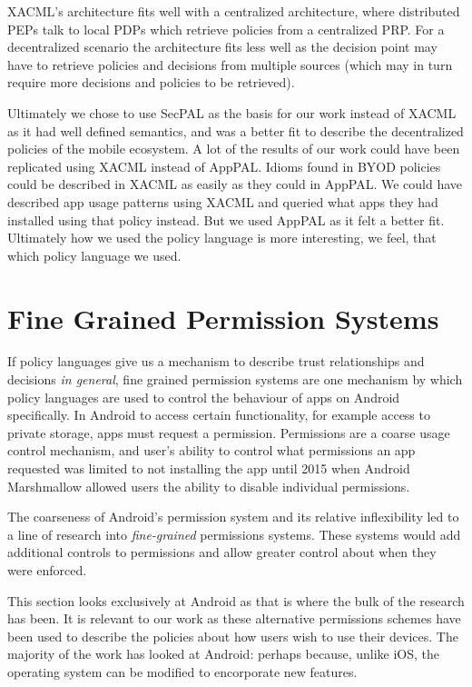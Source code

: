 \documentclass[thesis.tex]{subfiles}
\begin{document}
XACML's architecture fits well with a centralized architecture, where
distributed PEPs talk to local PDPs which retrieve policies from a centralized
PRP. For a decentralized scenario the architecture fits less well as the
decision point may have to retrieve policies and decisions from multiple sources
(which may in turn require more decisions and policies to be retrieved).

Ultimately we chose to use SecPAL as the basis for our work instead of XACML as
it had well defined semantics, and was a better fit to describe the
decentralized policies of the mobile ecosystem. A lot of the results of our work
could have been replicated using XACML instead of AppPAL. Idioms found in BYOD
policies could be described in XACML as easily as they could in AppPAL. We could
have described app usage patterns using XACML and queried what apps they had
installed using that policy instead. But we used AppPAL as it felt a better fit.
Ultimately how we used the policy language is more interesting, we feel, that
which policy language we used.

\section{Fine Grained Permission Systems}

If policy languages give us a mechanism to describe trust relationships and
decisions \emph{in general}, fine grained permission systems are one mechanism
by which policy languages are used to control the behaviour of apps on Android
specifically. In Android to access certain functionality, for example access to
private storage, apps must request a permission. Permissions are a coarse usage
control mechanism, and user's ability to control what permissions an app
requested was limited to not installing the app until 2015 when Android
Marshmallow allowed users the ability to disable individual permissions.

The coarseness of Android's permission system and its
relative inflexibility led to a line of research into
\emph{fine-grained} permissions systems.  These systems would add
additional controls to permissions and allow greater control about
when they were enforced.

This section looks exclusively at Android as that is where the bulk of the
research has been. It is relevant to our work as these alternative permissions
schemes have been used to describe the policies about how users wish to use
their devices. The majority of the work has looked at Android: perhaps because,
unlike iOS, the operating system can be modified to encorporate new features.
\end{document}
